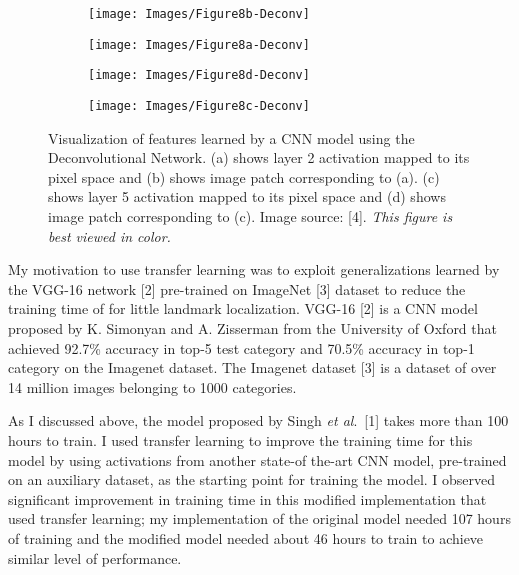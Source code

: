 \documentclass [11pt,letterpaper ,twoside ,openany ]{report}
\begin{document}
    \begin{figure}[t]
    \centering
        \begin{subfigure}[b]{0.23\linewidth}
            \centering
            \texttt{[image: Images/Figure8b-Deconv]}
            \caption{}
        \end{subfigure}    
        \begin{subfigure}[b]{0.23\linewidth}
            \centering
            \texttt{[image: Images/Figure8a-Deconv]}
            \caption{}
        \end{subfigure}
        \begin{subfigure}[b]{0.23\linewidth}
            \centering
            \texttt{[image: Images/Figure8d-Deconv]}
            \caption{}
        \end{subfigure}                
        \begin{subfigure}[b]{0.23\linewidth}
            \centering
            \texttt{[image: Images/Figure8c-Deconv]}
            \caption{}
        \end{subfigure}
        \caption{Visualization of features learned by a CNN model using the Deconvolutional Network. (a) shows layer 2 activation mapped to its pixel space and (b) shows image patch corresponding to (a). (c) shows layer 5 activation mapped to its pixel space and (d) shows image patch corresponding to (c). Image source: [4]. \textit{This figure is best viewed in color.}}
        \label{fig:devonv}
    \end{figure}

    My motivation to use transfer learning was to exploit generalizations learned by the VGG-16 network [2] pre-trained on ImageNet [3] dataset to reduce the training time of for little landmark localization. VGG-16 [2] is a CNN model proposed by K. Simonyan and A. Zisserman from the University of Oxford that achieved 92.7\% accuracy in top-5 test category and 70.5\% accuracy in top-1 category on the Imagenet dataset. The Imagenet dataset [3] is a dataset of over 14 million images belonging to 1000 categories.

    As I discussed above, the model proposed by Singh \textit{et al}.\ [1] takes more than 100 hours to train. I used transfer learning to improve the training time for this model by using activations from another state-of the-art CNN model, pre-trained on an auxiliary dataset, as the starting point for training the model. I observed significant improvement in training time in this modified implementation that used transfer learning; my implementation of the original model needed 107 hours of training and the modified model needed about 46 hours to train to achieve similar level of performance.
\end{document}

